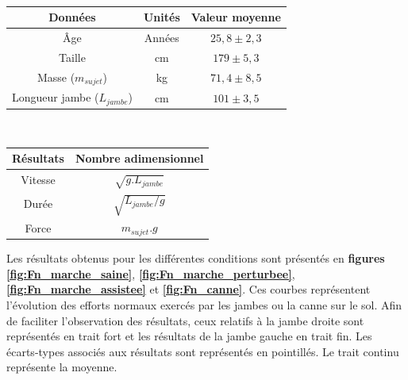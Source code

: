 \medskip
\begin{footnotesize}
   \begin{minipage}[t]{.49\linewidth}
~
\centering
\begin{tabular}{|c|c|c|}
  \hline
  \textbf{Données} & \textbf{Unités} & \textbf{Valeur moyenne}  \\ 
  \hline
  \^Age & Années & $25,8 \pm 2,3$ \\ 
  \hline
  Taille & cm & $179 \pm 5,3$ \\ 
  \hline
  Masse ($m_{sujet}$) & kg & $71,4 \pm 8,5$ \\ 
  \hline
  Longueur jambe ($L_{jambe}$) & cm & $101 \pm 3,5$ \\
\hline
\end{tabular} 


   \end{minipage} \hfill
   \begin{minipage}[t]{.49\linewidth}
      ~\vspace*{1mm}
\centering
\begin{tabular}{|c|c|}
  \hline
  \textbf{Résultats} & \textbf{Nombre adimensionnel}  \\ 
  \hline
  Vitesse & $\sqrt{g.L_{jambe}}$  \\ 
  \hline
  Durée & $\sqrt{L_{jambe}/g}$ \\ 
  \hline
  Force & $m_{sujet}.g$ \\
\hline
\end{tabular} 


   \end{minipage}
   \end{footnotesize}


Les résultats obtenus pour les différentes conditions sont présentés en \textbf{figures} \textbf{\ref{fig:Fn_marche_saine}}, \textbf{\ref{fig:Fn_marche_perturbee}}, \textbf{\ref{fig:Fn_marche_assistee}} et \textbf{\ref{fig:Fn_canne}}.
Ces courbes représentent l'évolution des efforts normaux exercés par les jambes ou la canne sur le sol.
 Afin de faciliter l'observation des résultats, ceux relatifs à la jambe droite sont représentés en trait fort et les résultats de la jambe gauche en trait fin. Les écarts-types associés aux résultats sont représentés en pointillés. Le trait continu représente la moyenne.

